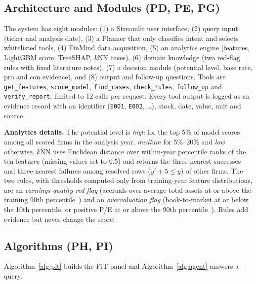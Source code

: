 \documentclass[conference]{IEEEtran}
\begin{document}
\subsection{Architecture and Modules (PD, PE, PG)}
The system has eight modules: (1) a Streamlit user interface, (2) query input (ticker and analysis date), (3) a Planner that only classifies intent and selects whitelisted tools, (4) FinMind data acquisition, (5) an analytics engine (features, LightGBM score, TreeSHAP, $k$NN cases), (6) domain knowledge (two red-flag rules with fixed literature notes), (7) a decision module (potential level, base rate, pro and con evidence), and (8) output and follow-up questions. Tools are \texttt{get\_features}, \texttt{score\_model}, \texttt{find\_cases}, \texttt{check\_rules}, \texttt{follow\_up} and \texttt{verify\_report}, limited to 12 calls per request. Every tool output is logged as an evidence record with an identifier (\texttt{E001}, \texttt{E002}, \dots), stock, date, value, unit and source.

\textbf{Analytics details.} The potential level is \emph{high} for the top 5\% of model scores among all scored firms in the analysis year, \emph{medium} for 5\%--20\% and \emph{low} otherwise. $k$NN uses Euclidean distance over within-year percentile ranks of the ten features (missing values set to 0.5) and returns the three nearest successes and three nearest failures among resolved rows ($y'+5 \le y$) of other firms. The two rules, with thresholds computed only from training-year feature distributions, are an \emph{earnings-quality red flag} (accruals over average total assets at or above the training 90th percentile~\cite{b15}) and an \emph{overvaluation flag} (book-to-market at or below the 10th percentile, or positive P/E at or above the 90th percentile~\cite{b16}). Rules add evidence but never change the score.

\subsection{Algorithms (PH, PI)}
Algorithm~\ref{alg:pit} builds the PiT panel and Algorithm~\ref{alg:agent} answers a query.
\end{document}
